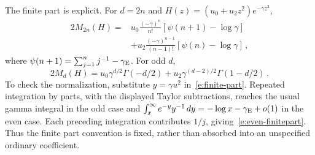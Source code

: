 \documentclass[11pt]{amsart}
\theoremstyle{definition}
\theoremstyle{remark}
\numberwithin{equation}{section}
\newcommand{\dd}{\,d}
\begin{document}
The finite part is explicit. For $d=2n$ and $H(z)=(u_0+u_2z^2)e^{-\gamma z^2}$,
\begin{equation}\label{e:even-finitepart}
 \begin{split}
 2M_{2n}(H)={}&u_0\frac{(-\gamma)^n}{n!}
                     [\psi(n+1)-\log\gamma]\\
 &+u_2\frac{(-\gamma)^{n-1}}{(n-1)!}
                     [\psi(n)-\log\gamma]\, ,
 \end{split}
\end{equation}
where $\psi(n+1)=\sum_{j=1}^n j^{-1}-\gamma_{\rm E}$. For odd $d$,
\begin{equation}\label{e:odd-finitepart}
 2M_d(H)=u_0\gamma^{d/2}\Gamma(-d/2)
             +u_2\gamma^{(d-2)/2}\Gamma(1-d/2)\, .
\end{equation}
To check the normalization, substitute $y=\gamma u^2$ in~\eqref{e:finite-part}. Repeated integration by parts, with the displayed Taylor subtractions, reaches the usual gamma integral in the odd case and $\int_x^\infty e^{-y}y^{-1}\dd y=-\log x-\gamma_{\rm E}+o(1)$ in the even case. Each preceding integration contributes $1/j$, giving~\eqref{e:even-finitepart}. Thus the finite part convention is fixed, rather than absorbed into an unspecified ordinary coefficient.
\end{document}

